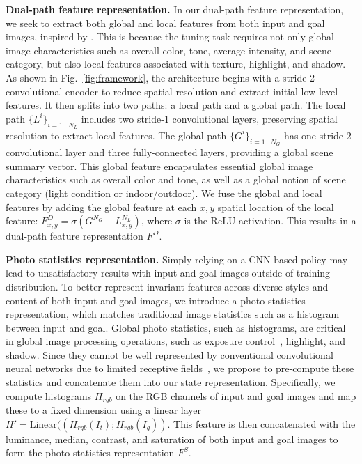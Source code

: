 \documentclass{article}
\begin{document}
\noindent\textbf{Dual-path feature representation.}
In our dual-path feature representation, we seek to extract both global and local features from both input and goal images, inspired by \cite{gharbi2017deep}. This is because the tuning task requires not only global image characteristics such as overall color, tone, average intensity, and scene category, but also local features associated with texture, highlight, and shadow. 
As shown in Fig.~\ref{fig:framework}, the architecture begins with a stride-2 convolutional encoder to reduce spatial resolution and extract initial low-level features. It then splits into two paths: a local path and a global path. The local path $\{L^i\}_{i=1...N_L}$ includes two stride-1 convolutional layers, preserving spatial resolution to extract local features. The global path $\{G^i\}_{i=1...N_G}$ has one stride-2 convolutional layer and three fully-connected layers, providing a global scene summary vector. This global feature encapsulates essential global image characteristics such as overall color and tone, as well as a global notion of scene category (light condition or indoor/outdoor).
We fuse the global and local features by adding the global feature at each $x, y$ spatial location of the local feature: $F^{D}_{x,y} = \sigma (G^{N_G} + L^{N_L}_{x,y})$, where $\sigma$ is the ReLU activation. This results in a dual-path feature representation $F^D$. 




 

\noindent\textbf{Photo statistics representation.}
Simply relying on a CNN-based policy may lead to unsatisfactory results with input and goal images outside of training distribution. To better represent invariant features across diverse styles and content of both input and goal images, we introduce a photo statistics representation, which matches traditional image statistics such as a histogram between input and goal.
Global photo statistics, such as histograms, are critical in global image processing operations, such as exposure control~\cite{onzon2021neural}, highlight, and shadow. Since they cannot be well represented by conventional convolutional neural networks due to limited receptive fields~\cite{tseng2022neural}, we propose to pre-compute these statistics and concatenate them into our state representation. Specifically, we compute histograms $H_{rgb}$ on the RGB channels of input and goal images and map these to a fixed dimension using a linear layer $H' = \text{Linear}((H_{rgb}(I_t);H_{rgb}(I_g))$. This feature is then concatenated with the luminance, median, contrast, and saturation of both input and goal images to form the photo statistics representation $F^S$.
\end{document}
